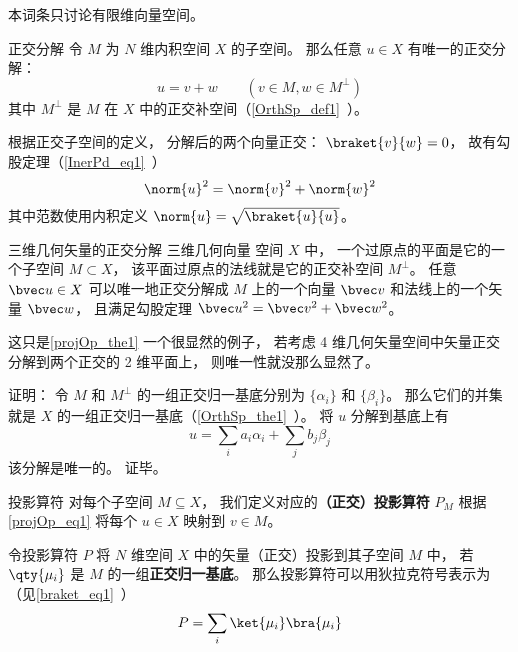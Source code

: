 

本词条只讨论有限维向量空间。

\begin{theorem}{正交分解}\label{projOp_the1}
令 $M$ 为 $N$ 维内积空间 $X$ 的子空间。 那么任意 $u\in X$ 有唯一的正交分解：
\begin{equation}\label{projOp_eq1}
u = v + w \qquad (v\in M, w\in M^\bot)
\end{equation}
其中 $M^\bot$ 是 $M$ 在 $X$ 中的正交补空间（\autoref{OrthSp_def1}~）。
\end{theorem}
根据正交子空间的定义， 分解后的两个向量正交： $\braket{v}{w} = 0$， 故有勾股定理（\autoref{InerPd_eq1}~）
\begin{equation}
\norm{u}^2 = \norm{v}^2 + \norm{w}^2
\end{equation}
其中范数使用内积定义 $\norm{u} = \sqrt{\braket{u}{u}}$。

\begin{example}{三维几何矢量的正交分解}
三维几何向量 空间 $X$ 中， 一个过原点的平面是它的一个子空间 $M \subset X$， 该平面过原点的法线就是它的正交补空间 $M^\bot$。  任意 $\bvec u \in X$ 可以唯一地正交分解成 $M$ 上的一个向量 $\bvec v$ 和法线上的一个矢量 $\bvec w$， 且满足勾股定理 $\bvec u^2 = \bvec v^2 + \bvec w^2$。

这只是\autoref{projOp_the1} 一个很显然的例子， 若考虑 4 维几何矢量空间中矢量正交分解到两个正交的 2 维平面上， 则唯一性就没那么显然了。
\end{example}

证明： 令 $M$ 和 $M^\bot$ 的一组正交归一基底分别为 $\{\alpha_i\}$ 和 $\{\beta_i\}$。 那么它们的并集就是 $X$ 的一组正交归一基底（\autoref{OrthSp_the1}~）。 将 $u$ 分解到基底上有
\begin{equation}
u = \sum_i a_i \alpha_i + \sum_j b_j \beta_j
\end{equation}
该分解是唯一的。 证毕。

\begin{definition}{投影算符}
对每个子空间 $M\subseteq X$， 我们定义对应的\textbf{（正交）投影算符} $P_M$ 根据\autoref{projOp_eq1} 将每个 $u\in X$ 映射到 $v\in M$。
\end{definition}

\begin{theorem}{}
令投影算符 $P$ 将 $N$ 维空间 $X$ 中的矢量（正交）投影到其子空间 $M$ 中， 若 $\qty{\mu_i}$ 是 $M$ 的一组\textbf{正交归一基底}。 那么投影算符可以用狄拉克符号表示为（见\autoref{braket_eq1}~）
\begin{equation}
P = \sum_i \ket{\mu_i}\bra{\mu_i}
\end{equation}
\end{theorem}




